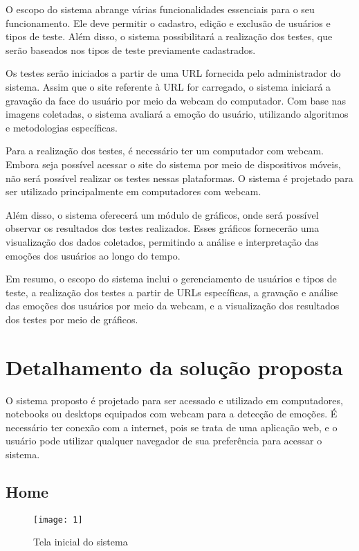 O escopo do sistema abrange várias funcionalidades essenciais para o seu funcionamento. Ele deve permitir o cadastro, edição e exclusão de usuários e tipos de teste. Além disso, o sistema possibilitará a realização dos testes, que serão baseados nos tipos de teste previamente cadastrados.

Os testes serão iniciados a partir de uma URL fornecida pelo administrador do sistema. Assim que o site referente à URL for carregado, o sistema iniciará a gravação da face do usuário por meio da webcam do computador. Com base nas imagens coletadas, o sistema avaliará a emoção do usuário, utilizando algoritmos e metodologias específicas.

Para a realização dos testes, é necessário ter um computador com webcam. Embora seja possível acessar o site do sistema por meio de dispositivos móveis, não será possível realizar os testes nessas plataformas. O sistema é projetado para ser utilizado principalmente em computadores com webcam.

Além disso, o sistema oferecerá um módulo de gráficos, onde será possível observar os resultados dos testes realizados. Esses gráficos fornecerão uma visualização dos dados coletados, permitindo a análise e interpretação das emoções dos usuários ao longo do tempo.

Em resumo, o escopo do sistema inclui o gerenciamento de usuários e tipos de teste, a realização dos testes a partir de URLs específicas, a gravação e análise das emoções dos usuários por meio da webcam, e a visualização dos resultados dos testes por meio de gráficos.

\section{Detalhamento da solução proposta}

O sistema proposto é projetado para ser acessado e utilizado em computadores, notebooks ou desktops equipados com webcam para a detecção de emoções. É necessário ter conexão com a internet, pois se trata de uma aplicação web, e o usuário pode utilizar qualquer navegador de sua preferência para acessar o sistema.

\subsection{Home}

\begin{figure}[h]
  \caption{Tela inicial do sistema}
  \centering
  \texttt{[image: 1]}
  \label{fig:1}
\end{figure}
\FloatBarrier

